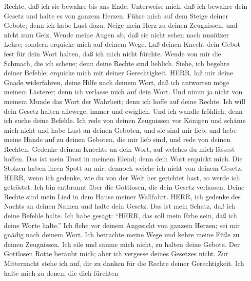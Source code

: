 Rechte, daß ich sie bewahre bis ans Ende.  Unterweise mich,
daß ich bewahre dein Gesetz und halte es von ganzem Herzen.
 Führe mich auf dem Steige deiner Gebote; denn ich habe
Lust dazu.  Neige mein Herz zu deinen Zeugnissen, und nicht
zum Geiz.  Wende meine Augen ab, daß sie nicht sehen nach
unnützer Lehre; sondern erquicke mich auf deinem Wege.  Laß
deinen Knecht dein Gebot fest für dein Wort halten, daß ich mich nicht
fürchte.  Wende von mir die Schmach, die ich scheue; denn
deine Rechte sind lieblich.  Siehe, ich begehre deiner
Befehle; erquicke mich mit deiner Gerechtigkeit.  HERR, laß
mir deine Gnade widerfahren, deine Hilfe nach deinem Wort, 
daß ich antworten möge meinem Lästerer; denn ich verlasse mich auf dein
Wort.  Und nimm ja nicht von meinem Munde das Wort der
Wahrheit; denn ich hoffe auf deine Rechte.  Ich will dein
Gesetz halten allewege, immer und ewiglich.  Und ich wandle
fröhlich; denn ich suche deine Befehle.  Ich rede von
deinen Zeugnissen vor Königen und schäme mich nicht  und
habe Lust an deinen Geboten, und sie sind mir lieb,  und
hebe meine Hände auf zu deinen Geboten, die mir lieb sind, und rede von
deinen Rechten.  Gedenke deinem Knechte an dein Wort, auf
welches du mich lässest hoffen.  Das ist mein Trost in
meinem Elend; denn dein Wort erquickt mich.  Die Stolzen
haben ihren Spott an mir; dennoch weiche ich nicht von deinem Gesetz.
 HERR, wenn ich gedenke, wie du von der Welt her gerichtet
hast, so werde ich getröstet.  Ich bin entbrannt über die
Gottlosen, die dein Gesetz verlassen.  Deine Rechte sind
mein Lied in dem Hause meiner Wallfahrt.  HERR, ich gedenke
des Nachts an deinen Namen und halte dein Gesetz.  Das ist
mein Schatz, daß ich deine Befehle halte.  Ich habe gesagt:
``HERR, das soll mein Erbe sein, daß ich deine Worte halte.''
 Ich flehe vor deinem Angesicht von ganzem Herzen; sei mir
gnädig nach deinem Wort.  Ich betrachte meine Wege und
kehre meine Füße zu deinen Zeugnissen.  Ich eile und säume
mich nicht, zu halten deine Gebote.  Der Gottlosen Rotte
beraubt mich; aber ich vergesse deines Gesetzes nicht.  Zur
Mitternacht stehe ich auf, dir zu danken für die Rechte deiner
Gerechtigkeit.  Ich halte mich zu denen, die dich fürchten
